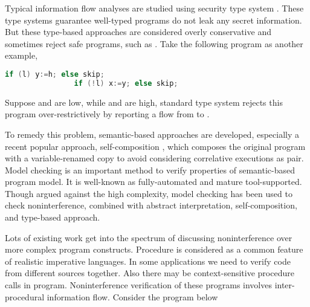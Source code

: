 \documentclass{llncs}
\begin{document}
Typical information flow analyses are studied using security type
system
\cite{DBLP:journals/jcs/VolpanoIS96}\cite{DBLP:conf/tapsoft/VolpanoS97}\cite{DBLP:conf/popl/SmithV98}\cite{DBLP:conf/popl/HeintzeR98}\cite{mcps:sabefeld}.
These type systems guarantee well-typed programs do not leak any
secret information. But these type-based approaches are considered
overly conservative and sometimes reject safe programs, such as
. Take the following program as
another example,

\begin{minipage}[t]{4.8in}
\begin{lstlisting}[language=C,basicstyle=\footnotesize]
                if (l) y:=h; else skip;
                if (!l) x:=y; else skip;
\end{lstlisting}
\end{minipage}
Suppose  and  are \textsf{low}, while  and  are
\textsf{high}, standard type
system\cite{DBLP:journals/jcs/VolpanoIS96} rejects this program
over-restrictively by reporting a flow from  to .

To remedy this problem, semantic-based
approaches\cite{DBLP:journals/scp/JoshiL00}\cite{DBLP:journals/lisp/SabelfeldS01}
are developed, especially a recent popular approach,
self-composition
\cite{DBLP:conf/csfw/BartheDR04}\cite{DBLP:conf/sas/TerauchiA05},
which composes the original program with a variable-renamed copy to
avoid considering correlative executions as pair. Model checking is
an important method to verify properties of semantic-based program
model. It is well-known as fully-automated and mature
tool-supported. Though argued against the high complexity, model
checking has been used to check noninterference, combined with
abstract interpretation\cite{DBLP:journals/fuin/FrancescoST03},
self-composition\cite{DBLP:conf/sas/TerauchiA05}\cite{DBLP:conf/pldi/UnnoKY06},
and type-based approach\cite{DBLP:conf/pldi/UnnoKY06}.

Lots of existing work get into the spectrum of discussing
noninterference over more complex program constructs. Procedure is
considered as a common feature of realistic imperative languages. In
some applications we need to verify code from different sources
together. Also there may be context-sensitive procedure calls in
program. Noninterference verification of these programs involves
inter-procedural information flow. Consider the program below
\end{document}
